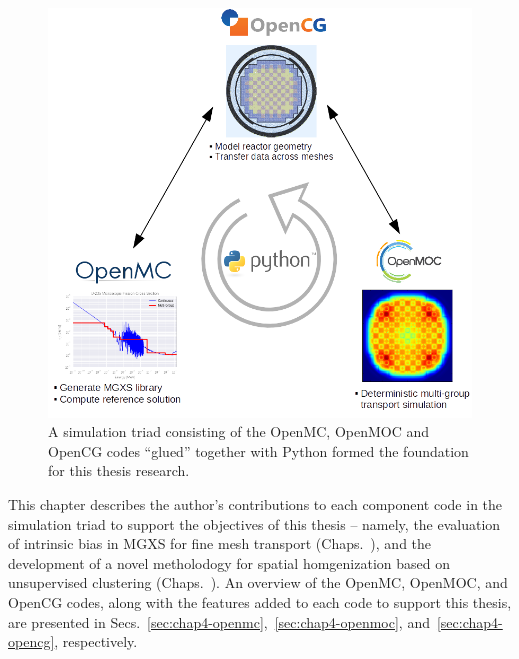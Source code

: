 \begin{figure}[h]
  \centering
  \includegraphics[width=0.8\linewidth]{figures/workflow/triad/simulation-triad}
\caption[A simulation triad of OpenMC, OpenMOC and OpenCG]{A simulation triad consisting of the OpenMC, OpenMOC and OpenCG codes ``glued'' together with Python formed the foundation for this thesis research.}
\label{fig:chap4-simulation-triad}
\end{figure}

This chapter describes the author's contributions to each component code in the simulation triad to support the objectives of this thesis -- namely, the evaluation of intrinsic bias in \ac{MGXS} for fine mesh transport (Chaps.~), and the development of a novel metholodogy for spatial homgenization based on unsupervised clustering (Chaps.~). An overview of the OpenMC, OpenMOC, and OpenCG codes, along with the features added to each code to support this thesis, are presented in Secs.~\ref{sec:chap4-openmc},~\ref{sec:chap4-openmoc}, and~\ref{sec:chap4-opencg}, respectively.


  
